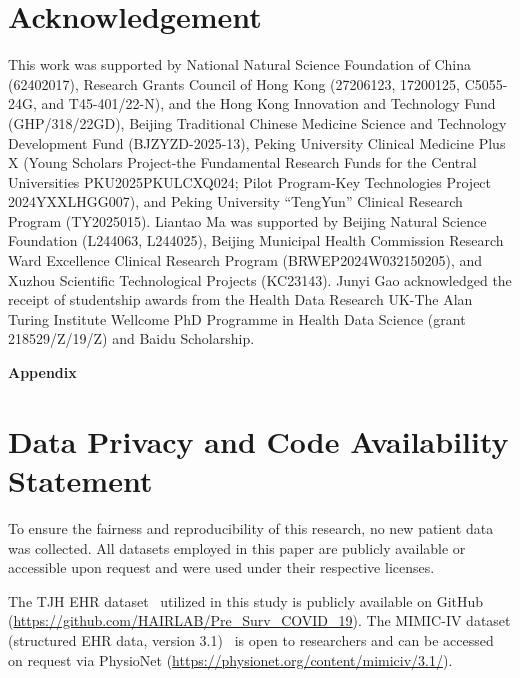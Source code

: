 \documentclass{article}
\begin{document}
\section*{Acknowledgement}

This work was supported by National Natural Science Foundation of China (62402017), Research Grants Council of Hong Kong (27206123, 17200125, C5055-24G, and T45-401/22-N), and the Hong Kong Innovation and Technology Fund (GHP/318/22GD), Beijing Traditional Chinese Medicine Science and Technology Development Fund (BJZYZD-2025-13), Peking University Clinical Medicine Plus X (Young Scholars Project-the Fundamental Research Funds for the Central Universities PKU2025PKULCXQ024; Pilot Program-Key Technologies Project 2024YXXLHGG007), and Peking University ``TengYun'' Clinical Research Program (TY2025015). Liantao Ma was supported by 
Beijing Natural Science Foundation (L244063, L244025), Beijing Municipal Health Commission Research Ward Excellence Clinical Research Program (BRWEP2024W032150205), and Xuzhou Scientific Technological Projects (KC23143). Junyi Gao acknowledged the receipt of studentship awards from the Health Data Research UK-The Alan Turing Institute Wellcome PhD Programme in Health Data Science (grant 218529/Z/19/Z) and Baidu Scholarship.

\clearpage
\newpage



\clearpage
\newpage
\appendix
\begin{center}
\LARGE\textbf{Appendix}
\label{sec:appendix}
\end{center}

\section{Data Privacy and Code Availability Statement}
\label{sec:app_data_privacy_code}

To ensure the fairness and reproducibility of this research, no new patient data was collected. All datasets employed in this paper are publicly available or accessible upon request and were used under their respective licenses.

The TJH EHR dataset~\cite{yan2020interpretable} utilized in this study is publicly available on GitHub (\url{https://github.com/HAIRLAB/Pre_Surv_COVID_19}). The MIMIC-IV dataset (structured EHR data, version 3.1)~\cite{mimiciv_v3_1} is open to researchers and can be accessed on request via PhysioNet (\url{https://physionet.org/content/mimiciv/3.1/}).
\end{document}
